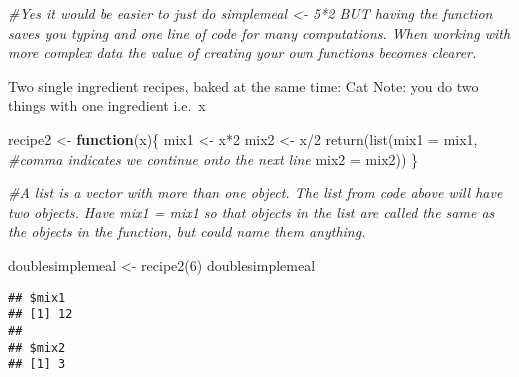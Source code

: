 \documentclass[
]{article}
\newenvironment{Shaded}{\begin{snugshade}}{\end{snugshade}}
\newcommand{\AttributeTok}[1]{\textcolor[rgb]{0.77,0.63,0.00}{#1}}
\newcommand{\CommentTok}[1]{\textcolor[rgb]{0.56,0.35,0.01}{\textit{#1}}}
\newcommand{\ControlFlowTok}[1]{\textcolor[rgb]{0.13,0.29,0.53}{\textbf{#1}}}
\newcommand{\DecValTok}[1]{\textcolor[rgb]{0.00,0.00,0.81}{#1}}
\newcommand{\FunctionTok}[1]{\textcolor[rgb]{0.00,0.00,0.00}{#1}}
\newcommand{\NormalTok}[1]{#1}
\newcommand{\OtherTok}[1]{\textcolor[rgb]{0.56,0.35,0.01}{#1}}
\newcommand{\SpecialCharTok}[1]{\textcolor[rgb]{0.00,0.00,0.00}{#1}}
\begin{document}
\begin{Shaded}
\begin{Highlighting}[]
\CommentTok{\#Yes it would be easier to just do simplemeal \textless{}{-} 5*2 BUT having the function saves you typing and one line of code for many computations. When working with more complex data the value of creating your own functions becomes clearer. }
\end{Highlighting}
\end{Shaded}

Two single ingredient recipes, baked at the same time: Cat Note: you do
two things with one ingredient i.e.~x

\begin{Shaded}
\begin{Highlighting}[]
\NormalTok{recipe2 }\OtherTok{\textless{}{-}} \ControlFlowTok{function}\NormalTok{(x)\{}
\NormalTok{  mix1 }\OtherTok{\textless{}{-}}\NormalTok{ x}\SpecialCharTok{*}\DecValTok{2}
\NormalTok{  mix2 }\OtherTok{\textless{}{-}}\NormalTok{ x}\SpecialCharTok{/}\DecValTok{2}
  \FunctionTok{return}\NormalTok{(}\FunctionTok{list}\NormalTok{(}\AttributeTok{mix1 =}\NormalTok{ mix1, }\CommentTok{\#comma indicates we continue onto the next line}
              \AttributeTok{mix2 =}\NormalTok{ mix2))}
\NormalTok{  \}}

\CommentTok{\#A list is a vector with more than one object. The list from code above will have two objects. Have mix1 = mix1 so that objects in the list are called the same as the objects in the function, but could name them anything.}

\NormalTok{doublesimplemeal }\OtherTok{\textless{}{-}} \FunctionTok{recipe2}\NormalTok{(}\DecValTok{6}\NormalTok{)}
\NormalTok{doublesimplemeal}
\end{Highlighting}
\end{Shaded}

\begin{verbatim}
## $mix1
## [1] 12
## 
## $mix2
## [1] 3
\end{verbatim}

\begin{Shaded}
\end{Shaded}
\end{document}
